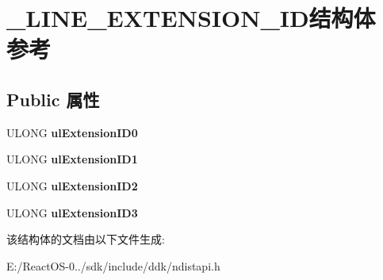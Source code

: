 \hypertarget{struct___l_i_n_e___e_x_t_e_n_s_i_o_n___i_d}{}\section{\+\_\+\+L\+I\+N\+E\+\_\+\+E\+X\+T\+E\+N\+S\+I\+O\+N\+\_\+\+I\+D结构体 参考}
\label{struct___l_i_n_e___e_x_t_e_n_s_i_o_n___i_d}
\subsection*{Public 属性}
\begin{DoxyCompactItemize}
\item 
\mbox{\label{struct___l_i_n_e___e_x_t_e_n_s_i_o_n___i_d_a461f434e914a5d97c3b7389bb91e08bc}} 
U\+L\+O\+NG {\bfseries ul\+Extension\+I\+D0}
\item 
\mbox{\label{struct___l_i_n_e___e_x_t_e_n_s_i_o_n___i_d_afe5e0cb867acd5dbadd902aae8286bb8}} 
U\+L\+O\+NG {\bfseries ul\+Extension\+I\+D1}
\item 
\mbox{\label{struct___l_i_n_e___e_x_t_e_n_s_i_o_n___i_d_a80b4871b8dad9e2e391c783881b2f244}} 
U\+L\+O\+NG {\bfseries ul\+Extension\+I\+D2}
\item 
\mbox{\label{struct___l_i_n_e___e_x_t_e_n_s_i_o_n___i_d_a7376bcf221ceb9a3f7acc2394f917fb9}} 
U\+L\+O\+NG {\bfseries ul\+Extension\+I\+D3}
\end{DoxyCompactItemize}


该结构体的文档由以下文件生成\+:\begin{DoxyCompactItemize}
\item 
E\+:/\+React\+O\+S-\/0../sdk/include/ddk/ndistapi.\+h\end{DoxyCompactItemize}
